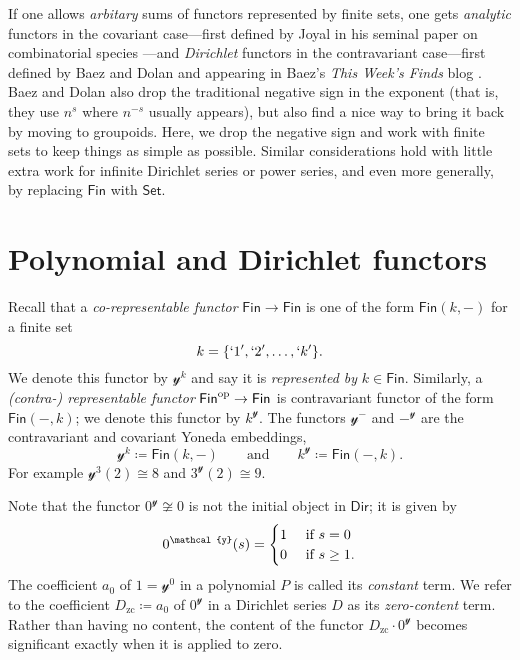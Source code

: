 \documentclass[11pt, article, one side]{memoir}
\theoremstyle{theorem}
\theoremstyle{definition}
\theoremstyle{remark}
\newcommand{\Cat}[1]{\mathsf{#1}}%
\newcommand{\op}{^\tn{op}}
\newcommand{\tn}[1]{\textnormal{#1}}
\newcommand{\smset}{\Cat{Set}}
\newcommand{\fin}{\Cat{Fin}}
\newcommand{\zero}[1]{#1_\text{zc}}
\newcommand{\yon}{\mathcal{y}}
\newcommand{\poly}{\Cat{Poly}}
\newcommand{\dir}{\Cat{Dir}}
\newcommand{\mdot}{{\cdot}}
\newcommand{\qqand}{\qquad\text{and}\qquad}
\begin{document}
If one allows \emph{arbitary} sums of functors represented by finite sets, one gets \emph{analytic} functors in the covariant case---first defined by Joyal in his seminal paper on combinatorial species \cite{J:Combinatorial.Species}---and \emph{Dirichlet} functors in the contravariant case---first defined by Baez and Dolan and appearing in Baez's \emph{This Week's Finds} blog \cite{BD:This.Weeks.Finds.300}. Baez and Dolan also drop the traditional negative sign in the exponent (that is, they use $n^s$ where $n^{-s}$ usually appears), but also find a nice way to bring it back by moving to groupoids. Here, we drop the negative sign and work with finite sets to keep things as simple as possible. Similar considerations hold with little extra work for infinite Dirichlet series or power series, and even more generally, by replacing $\fin$ with $\smset$. 



\chapter{Polynomial and Dirichlet functors}

Recall that a \emph{co-representable functor} $\fin\to\fin$ is one of the form $\fin(k, -)$ for a finite set
\[k=\{`1', `2',\ldots,`k'\}.\]
We denote this functor by $\yon^k$ and say it is \emph{represented by} $k\in\fin$. Similarly, a \emph{(contra-) representable functor} $\fin\op\to\fin$ is contravariant functor of the form $\fin(-,k)$; we denote this functor by $k^\yon$. The functors $\yon^-$ and $-^\yon$ are the contravariant and covariant Yoneda embeddings,
\[
  \yon^k \coloneqq \fin(k,-)
  \qqand
  k^\yon\coloneqq\fin(-,k).
\]
For example $\yon^3(2)\cong8$ and $3^\yon(2)\cong9$.

Note that the functor $0^\yon\not\cong 0$ is not the initial object in $\dir$; it is given by
\[
0^\yon(s)=
\begin{cases}
1&\tn{ if } s=0\\
0&\tn{ if } s\geq1.
\end{cases}
\]
The coefficient $a_0$ of $1=\yon^0$ in a polynomial $P$ is called its \emph{constant} term. We refer to the coefficient $\zero{D}\coloneqq a_0$ of $0^\yon$ in a Dirichlet series $D$ as its \emph{zero-content} term. Rather than having no content, the content of the functor $\zero{D}\mdot0^\yon$ becomes significant exactly when it is applied to zero.
\end{document}
